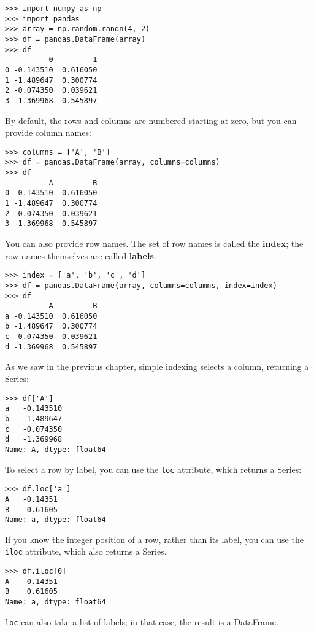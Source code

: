\begin{verbatim}
>>> import numpy as np
>>> import pandas
>>> array = np.random.randn(4, 2)
>>> df = pandas.DataFrame(array)
>>> df
          0         1
0 -0.143510  0.616050
1 -1.489647  0.300774
2 -0.074350  0.039621
3 -1.369968  0.545897
\end{verbatim}

By default, the rows and columns are numbered starting at zero, but
you can provide column names:

\begin{verbatim}
>>> columns = ['A', 'B']
>>> df = pandas.DataFrame(array, columns=columns)
>>> df
          A         B
0 -0.143510  0.616050
1 -1.489647  0.300774
2 -0.074350  0.039621
3 -1.369968  0.545897
\end{verbatim}

You can also provide row names.  The set of row names is called the
{\bf index}; the row names themselves are called {\bf labels}.

\begin{verbatim}
>>> index = ['a', 'b', 'c', 'd']
>>> df = pandas.DataFrame(array, columns=columns, index=index)
>>> df
          A         B
a -0.143510  0.616050
b -1.489647  0.300774
c -0.074350  0.039621
d -1.369968  0.545897
\end{verbatim}

As we saw in the previous chapter, simple indexing selects a
column, returning a Series:

\begin{verbatim}
>>> df['A']
a   -0.143510
b   -1.489647
c   -0.074350
d   -1.369968
Name: A, dtype: float64
\end{verbatim}

To select a row by label, you can use the {\tt loc} attribute, which
returns a Series:

\begin{verbatim}
>>> df.loc['a']
A   -0.14351
B    0.61605
Name: a, dtype: float64
\end{verbatim}

If you know the integer position of a row, rather than its label, you
can use the {\tt iloc} attribute, which also returns a Series.

\begin{verbatim}
>>> df.iloc[0]
A   -0.14351
B    0.61605
Name: a, dtype: float64
\end{verbatim}

{\tt loc} can also take a list of labels; in that case,
the result is a DataFrame.

